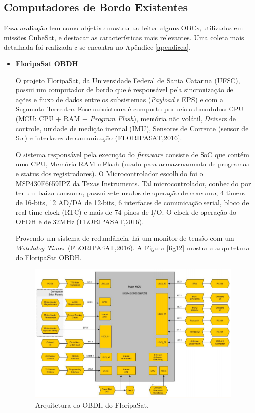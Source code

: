 \subsection{Computadores de Bordo Existentes}

Essa avaliação tem como objetivo mostrar ao leitor alguns OBCs, utilizados em missões CubeSat, e destacar as características mais relevantes. Uma coleta mais detalhada foi realizada e se encontra no Apêndice \ref{apendicea}.

\begin{itemize}

\item \textbf{FloripaSat OBDH}

	O projeto FloripaSat, da Universidade Federal de Santa Catarina (UFSC), possui um  computador de bordo que é responsável pela sincronização de ações e fluxo de dados entre os subsistemas (\textit{Payload} e EPS) e com a Segmento Terrestre. Esse subsistema é composto por seis submodulos: CPU (MCU: CPU + RAM + \textit{Program Flash}), memória não volátil, \textit{Driver}s de controle, unidade de medição inercial (IMU), Sensores de Corrente (sensor de Sol) e interfaces de comunicação (FLORIPASAT,2016).

	O sistema responsável pela execução do \textit{firmware} consiste de SoC que contém uma CPU, Memória RAM e Flash (usado para armazenamento de programas e status dos registradores). O Microcontrolador escolhido foi o MSP430F6659IPZ da Texas Instruments. Tal microcontrolador, conhecido por ter um baixo consumo, possui sete modos de operação de consumo, 4 timers de 16-bits, 12 AD/DA de 12-bits, 6 interfaces de comunicação serial, bloco de real-time clock (RTC) e mais de 74 pinos de I/O. O clock de operação do OBDH é de 32MHz (FLORIPASAT,2016).

	Provendo um sistema de redundância, há um monitor de tensão com um \textit{Watchdog Timer} (FLORIPASAT,2016). A Figura \ref{fig12} mostra a arquitetura do FloripaSat OBDH.

\begin{figure}[h]
	\centering
	
	\caption{Arquitetura do OBDH do FloripaSat.}
	
	\includegraphics[keepaspectratio=true,scale=0.5]{figuras/floripasatobdh.PNG}
	

\end{figure}
\end{itemize}
